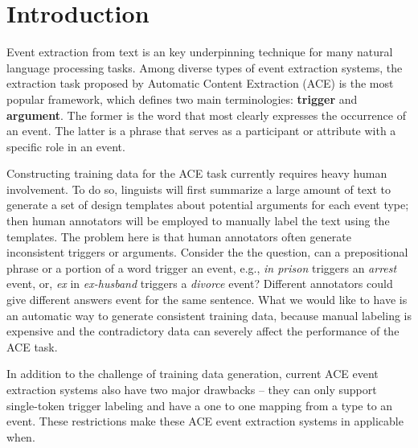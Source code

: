 \section{Introduction}
Event extraction from text is an key underpinning technique for many natural language processing tasks.
Among diverse types of event extraction systems, the extraction task proposed by Automatic Content Extraction (ACE)
\cite{doddington2004automatic} is the most popular framework, which defines two main terminologies: \textbf{trigger}
and \textbf{argument}. The former is the word that most clearly expresses the occurrence of an event. The latter is a
phrase that serves as a participant or attribute with a specific role in an event.

Constructing training data for the ACE task currently requires heavy human involvement. To do so, linguists will first
summarize a large amount of text to generate a set of design templates about potential arguments for each event type;
then human annotators will be employed to manually label the text using the templates. The problem here is that human
annotators often generate inconsistent triggers or arguments. Consider the the question, can a prepositional phrase or
a portion of a word trigger an event, e.g., \textit{in prison} triggers an \emph{arrest} event, or, \textit{ex} in
\textit{ex-husband} triggers a \emph{divorce} event? Different annotators could give different answers event for the
same sentence. What we would like to have is an automatic way to generate consistent training data, because manual labeling is
expensive and
the contradictory data can severely affect the performance of the ACE task.

In addition to the challenge of training data generation, current ACE event extraction systems
also have two major drawbacks -- they can only support single-token trigger labeling and have
a one to one mapping from a type to an event. These restrictions make these ACE event extraction
systems in applicable when. 



